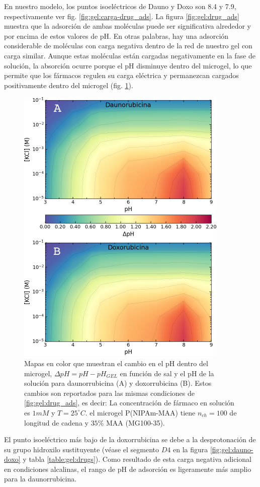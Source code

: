 En nuestro modelo, los puntos isoel\'ectricos de Dauno y Doxo son 8.4 y 7.9, respectivamente ver fig. \ref{fig:gel:carga-drug_ads}. La figura \ref{fig:gel:drug_ads} muestra que la adsorci\'on de ambas mol\'eculas puede ser significativa alrededor y por encima de estos valores de pH. En otras palabras, hay una adsorci\'on considerable de mol\'eculas con carga negativa dentro de la red de nuestro gel con carga similar. Aunque estas mol\'eculas est\'an cargadas negativamente en la fase de soluci\'on, la absorci\'on ocurre porque el pH disminuye dentro del microgel, lo que permite que los f\'armacos regulen su carga el\'ectrica y permanezcan cargados positivamente dentro del microgel (fig. \ref{fig:gel:drug_pH}).


\begin{figure}[!tb]
	\centering
	\includegraphics[width=0.55\linewidth]{Figures/graph-gel/drug_pH.pdf}
	\caption{Mapas en color que muestran el cambio en el pH dentro del microgel, $\Delta pH = pH - pH_{GEL}$ en funci\'on de sal y el pH de la soluci\'on para daunorrubicina (A) y doxorrubicina (B). Estos cambios son reportados para las mismas condiciones de \ref{fig:gel:drug_ads}, es decir:
		La concentraci\'on de f\'armaco en soluci\'on es $1mM$ y $T=25 ^\circ C$.
		el microgel P(NIPAm-MAA) tiene $n_{ch}=100$ de longitud de cadena y $35\%$ MAA (MG100-35).}
	\label{fig:gel:drug_pH}
\end{figure}

El punto isoel\'ectrico m\'as bajo de la doxorrubicina se debe a la desprotonaci\'on de su grupo hidroxilo sustituyente (v\'ease  el segmento $D4$ en la figura \ref{fig:gel:dauno-doxo} y tabla \ref{table:gel:drugs}). Como resultado de esta carga negativa adicional en condiciones alcalinas, el rango de pH de adsorci\'on es ligeramente m\'as amplio para la daunorrubicina.

